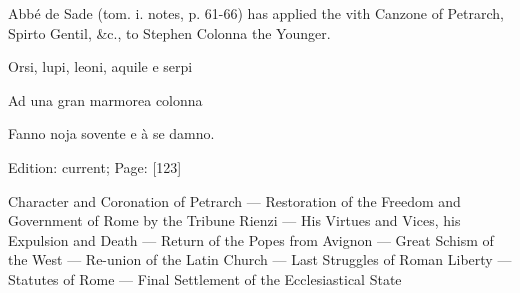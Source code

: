 {Abbé de Sade (tom. i. notes, p. 61-66) has applied the vith Canzone of Petrarch, Spirto Gentil, \&c., to Stephen Colonna the Younger.

Orsi, lupi, leoni, aquile e serpi

Ad una gran marmorea colonna

Fanno noja sovente e à se damno.}

Edition: current; Page: [123]


Character and Coronation of Petrarch \texthebrew{—} Restoration of the Freedom and Government of Rome by the Tribune Rienzi \texthebrew{—} His Virtues and Vices, his Expulsion and Death \texthebrew{—} Return of the Popes from Avignon \texthebrew{—} Great Schism of the West \texthebrew{—} Re-union of the Latin Church \texthebrew{—} Last Struggles of Roman Liberty \texthebrew{—} Statutes of Rome \texthebrew{—} Final Settlement of the Ecclesiastical State


